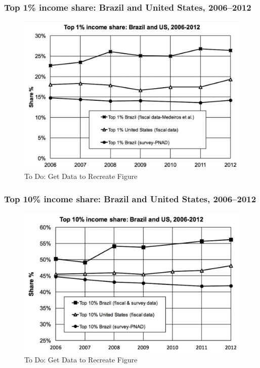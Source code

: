 \documentclass[t]{beamer}\usepackage[]{graphicx}\usepackage[]{color}
\begin{document}
\begin{frame}[label=BrazilUSTop1]
\frametitle{Top 1\% income share: Brazil and United States, 2006--2012}
\begin{figure}[t]
\begin{minipage}[b]{\textwidth}
\centering
\includegraphics[width=\textwidth]
{pictures/Top1BrazilVsUSA}
\caption{To Do: Get Data to Recreate Figure}
\end{minipage}
\end{figure}
\end{frame}


\begin{frame}[label=BrazilUSTop10]
\frametitle{Top 10\% income share: Brazil and United States, 2006--2012}
\begin{figure}[t]
\begin{minipage}[b]{\textwidth}
\centering
\includegraphics[width=\textwidth]
{pictures/Top10BrazilVsUSA}
\caption{To Do: Get Data to Recreate Figure}
\end{minipage}
\end{figure}
\end{frame}
\end{document}
